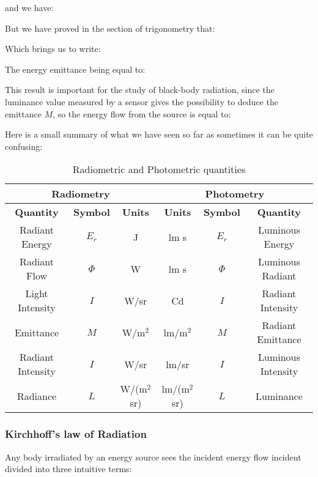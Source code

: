 	and we have:
	
	But we have proved in the section of trigonometry that:
	
	Which brings us to write:
	
	The energy emittance being equal to:
	
	This result is important for the study of black-body radiation, since the luminance value measured by a sensor gives the possibility to deduce the emittance $M$, so the energy flow from the source is equal to: 
	

	Here is a small summary of what we have seen so far as sometimes it can be quite confusing:
	\begin{table}[H]
	\begin{center}
		\begin{tabular}{|c|c|c||c|c|c|}
			\hline
			\multicolumn{3}{|c|}{\cellcolor{black!30}\textbf{Radiometry}} & \multicolumn{3}{|c|}{\cellcolor{black!30}\textbf{Photometry}}\\
			\hline
			\cellcolor{black!30}\textbf{Quantity} & \cellcolor{black!30}\textbf{Symbol} & \cellcolor{black!30}\textbf{Units} & \cellcolor{black!30}\textbf{Units} & \cellcolor{black!30}\textbf{Symbol} & \cellcolor{black!30}\textbf{Quantity}  \\
			\hline
			Radiant Energy & $E_r$ & J & lm s & $E_r$ & Luminous Energy \\
			\hline
			Radiant Flow & $\Phi$ & W & lm s & $\Phi$ & Luminous Radiant \\
			\hline
			Light Intensity & $I$ & W/sr & Cd & $I$ & Radiant Intensity \\
			\hline
			Emittance & $M$ & W/m$^2$ & lm/m$^2$ & $M$ & Radiant Emittance \\
			\hline
			Radiant Intensity & $I$ & W/sr & lm/sr & $I$ & Luminous Intensity\\
			\hline
			Radiance & $L$ & W/(m$^2$sr) & lm/(m$^2$sr) & $L$ & Luminance\\
			\hline
		\end{tabular}
		\caption[]{Radiometric and Photometric quantities}
	\end{center}
	\end{table}
	
	\pagebreak
	\subsubsection{Kirchhoff's law of Radiation}\label{kirchhoff law of radiation}
	Any body irradiated by an energy source sees the incident energy flow incident divided into three intuitive terms:
	
